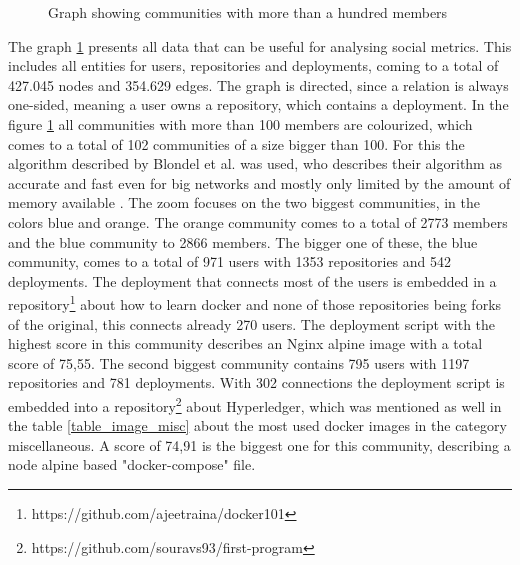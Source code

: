 \begin{figure}[H]\centering
{}
    \caption{Graph showing communities with more than a hundred members}
    \label{fig:graph_communities}
\end{figure}

The graph \ref{fig:graph_communities} presents all data that can be useful for analysing social metrics. This includes all entities for users, repositories and deployments, coming to a total of 427.045 nodes and 354.629 edges. The graph is directed, since a relation is always one-sided, meaning a user owns a repository, which contains a deployment. In the figure \ref{fig:graph_communities} all communities with more than 100 members are colourized, which comes to a total of 102 communities of a size bigger than 100. For this the algorithm described by Blondel et al. was used, who describes their algorithm as accurate and fast even for big networks and mostly only limited by the amount of memory available \cite{Blondel_2008}. The zoom focuses on the two biggest communities, in the colors blue and orange. The orange community comes to a total of 2773 members and the blue community to 2866 members. The bigger one of these, the blue community, comes to a total of 971 users with 1353 repositories and 542 deployments. The deployment that connects most of the users is embedded in a repository\footnote{https://github.com/ajeetraina/docker101} about how to learn docker and none of those repositories being forks of the original, this connects already 270 users. The deployment script with the highest score in this community describes an Nginx alpine image with a total score of 75,55.
The second biggest community contains 795 users with 1197 repositories and 781 deployments. With 302 connections the deployment script is embedded into a repository\footnote{https://github.com/souravs93/first-program} about Hyperledger, which was mentioned as well in the table \ref{table_image_misc} about the most used docker images in the category miscellaneous. A score of 74,91 is the biggest one for this community, describing a node alpine based "docker-compose" file.

